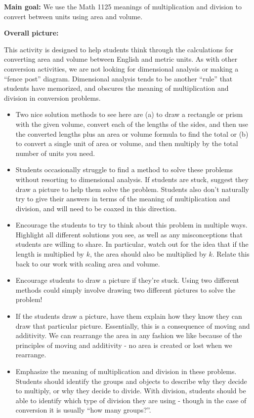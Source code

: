 \documentclass[nooutcomes,noauthor]{ximera}
\begin{document}
\begin{instructorNotes}

{\bf Main goal:} We use the Math 1125 meanings of multiplication and division to convert between units using area and volume.

{\bf Overall picture:} 

This activity is designed to help students think through the calculations for converting area and volume between English and metric units.  As with other conversion activities, we are not looking for dimensional analysis or making a ``fence post'' diagram. Dimensional analysis tends to be another ``rule'' that students have memorized, and obscures the meaning of multiplication and division in conversion problems.


\begin{itemize}
\item Two nice solution methods to see here are (a) to draw a rectangle or prism with the given volume, convert each of the lengths of the sides, and then use the converted lengths plus an area or volume formula to find the total or (b) to convert a single unit of area or volume, and then multiply by the total number of units you need.

\item Students occasionally struggle to find a method to solve these problems without resorting to dimensional analysis.  If students are stuck, suggest they draw a picture to help them solve the problem.  Students also don't naturally try to give their answers in terms of the meaning of multiplication and division, and will need to be coaxed in this direction.

	\item Encourage the students to try to think about this problem in multiple ways.   Highlight all different solutions you see, as well as any misconceptions that students are willing to share. In particular, watch out for the idea that if the length is multiplied by $k$, the area should also be multiplied by $k$. Relate this back to our work with scaling area and volume. 
	\item Encourage students to draw a picture if they're stuck.  Using two different methods could simply involve drawing two different pictures to solve the problem!
	\item If the students draw a picture, have them explain how they know they can draw that particular picture.  Essentially, this is a consequence of moving and additivity.  We can rearrange the area in any fashion we like because of the principles of moving and additivity - no area is created or lost when we rearrange. 
	\item Emphasize the meaning of multiplication and division in these problems.  Students should identify the groups and objects to describe why they decide to multiply, or why they decide to divide.  With division, students should be able to identify which type of division they are using - though in the case of conversion it is usually ``how many groups?''.
\end{itemize}



\end{instructorNotes}
\end{document}
